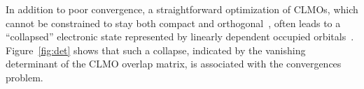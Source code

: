 \documentclass[aps,prl,twocolumn,reprint,amsmath,amssymb]{revtex4-1}
\begin{document}

In addition to poor convergence, a straightforward optimization of CLMOs, which cannot be constrained to stay both compact and orthogonal~\cite{stoll,ZZZ}, often leads to a ``collapsed'' electronic state represented by linearly dependent occupied orbitals~\cite{ordejon1995linear}. 
%
Figure~\ref{fig:det} shows that such a collapse, indicated by the vanishing determinant of the CLMO overlap matrix, is associated with 
the convergences problem. 
\end{document}
